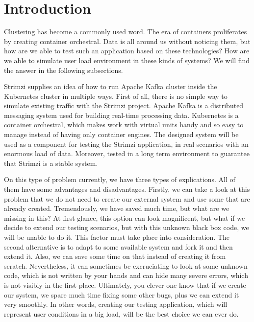 \documentclass{ExcelAtFIT}
\affiliation{*%
  \href{mailto:xokrsa02@fit.vutbr.cz}{xorsak02@fit.vutbr.cz},
  \textit{Faculty of Information Technology, Brno University of Technology}}
\begin{document}
\startdocument



\section{Introduction}

Clustering has become a commonly used word. The era of containers proliferates by creating container orchestral. Data is all around us without noticing them, but how are we able to test such an application based on these technologies? How are we able to simulate user load environment in these kinds of systems? We will find the answer in the following subsections.

Strimzi supplies an idea of how to run Apache Kafka cluster inside the Kubernetes cluster in multiple ways. First of all, there is no simple way to simulate existing traffic with the Strimzi project. Apache Kafka is a distributed messaging system used for building real-time processing data. Kubernetes is a container orchestral, which makes work with virtual units handy and so easy to manage instead of having only container engines. The designed system will be used as a component for testing the Strimzi application, in real scenarios with an enormous load of data. Moreover, tested in a long term environment to guarantee that Strimzi is a stable system.

On this type of problem currently, we have three types of explications. All of them have some advantages and disadvantages. Firstly, we can take a look at this problem that we do not need to create our external system and use some that are already created. Tremendously, we have saved much time, but what are we missing in this? At first glance, this option can look magnificent, but what if we decide to extend our testing scenarios, but with this unknown black box code, we will be unable to do it. This factor must take place into consideration. The second alternative is to adapt to some available system and fork it and then extend it. Also, we can save some time on that instead of creating it from scratch.
Nevertheless, it can sometimes be excruciating to look at some unknown code, which is not written by your hands and can hide many severe errors, which is not visibly in the first place. Ultimately, you clever one know that if we create our system, we spare much time fixing some other bugs, plus we can extend it very smoothly. In other words, creating our testing application, which will represent user conditions in a big load, will be the best choice we can ever do.
\end{document}
